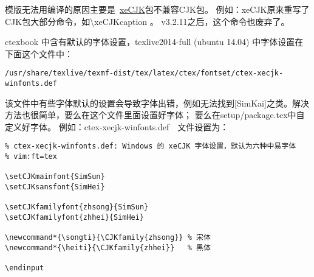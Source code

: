 


模版无法用\XeLaTeX 编译的原因主要是~\href{http://bay.uchicago.edu/tex-archive/macros/xetex/latex/xecjk/xeCJK.pdf}{xeCJK}包不兼容CJK包。
例如：xeCJK原来重写了CJK包大部分命令，如\textbackslash xeCJKcaption 。
v3.2.11之后，这个命令也废弃了。

ctexbook 中含有默认的字体设置，texlive2014-full (ubuntu 14.04) 中字体设置在下面这个文件中：
\begin{lstlisting}
/usr/share/texlive/texmf-dist/tex/latex/ctex/fontset/ctex-xecjk-winfonts.def
\end{lstlisting}

该文件中有些字体默认的设置会导致字体出错，例如无法找到[SimKai]之类。解决方法也很简单，要么在这个文件里面设置好字体；
要么在setup/package.tex中自定义好字体。
例如：ctex-xecjk-winfonts.def　文件设置为：

\begin{lstlisting}
% ctex-xecjk-winfonts.def: Windows 的 xeCJK 字体设置，默认为六种中易字体
% vim:ft=tex

\setCJKmainfont{SimSun}
\setCJKsansfont{SimHei}

\setCJKfamilyfont{zhsong}{SimSun}
\setCJKfamilyfont{zhhei}{SimHei}

\newcommand*{\songti}{\CJKfamily{zhsong}} % 宋体
\newcommand*{\heiti}{\CJKfamily{zhhei}}   % 黑体

\endinput
\end{lstlisting}


